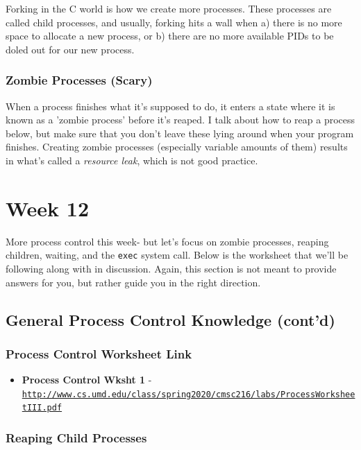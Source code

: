 \documentclass[english, 10pt]{article}
\begin{document}
Forking in the C world is how we create more processes. These processes are called child processes, and usually, forking hits a wall when a) there is no more space to allocate a new process, or b) there are no more available PIDs to be doled out for our new process.

\subsubsection{Zombie Processes (Scary)}

When a process finishes what it's supposed to do, it enters a state where it is known as a 'zombie process' before it's reaped. I talk about how to reap a process below, but make sure that you don't leave these lying around when your program finishes. Creating zombie processes (especially variable amounts of them) results in what's called a \textit{resource leak}, which is not good practice.

\section{Week 12}

More process control this week- but let's focus on zombie processes, reaping children, waiting, and the \texttt{exec} system call. Below is the worksheet that we'll be following along with in discussion. Again, this section is not meant to provide answers for you, but rather guide you in the right direction.

\subsection{General Process Control Knowledge (cont'd)}

\subsubsection{Process Control Worksheet Link}

\begin{itemize}
	\item \textbf{Process Control Wksht 1} - \texttt{\href{http://www.cs.umd.edu/class/spring2020/cmsc216/labs/ProcessWorksheetIII.pdf}{http://www.cs.umd.edu/class/spring2020/cmsc216/labs/ProcessWorksheetIII.pdf}}
\end{itemize}

\subsubsection{Reaping Child Processes}
\end{document}
